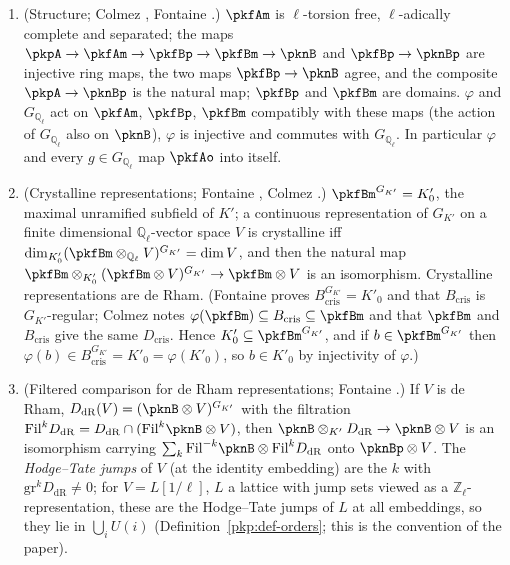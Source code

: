 \documentclass[10pt]{amsart}
\theoremstyle{definition}
\theoremstyle{remark}
\newcommand{\Z}{\mathbb Z}
\newcommand{\Q}{\mathbb Q}
\begin{document}
\begin{enumerate}
\item[(P1)] (Structure; Colmez \cite[\S III.2]{pkfColmez98}, Fontaine \cite[4.1]{pkfFontaineII}.)
$\pkfAm$ is $\ell$-torsion free, $\ell$-adically complete and separated; the maps
$\pkpA\to\pkfAm\to\pkfBp\to\pkfBm\to\pknB$ and $\pkfBp\to\pknBp$ are injective ring maps, the two maps
$\pkfBp\to\pknB$ agree, and the composite $\pkpA\to\pknBp$ is the natural map; $\pkfBp$ and $\pkfBm$
are domains. $\varphi$ and $G_{\Q_\ell}$ act on $\pkfAm$, $\pkfBp$, $\pkfBm$ compatibly with these maps
(the action of $G_{\Q_\ell}$ also on $\pknB$), $\varphi$ is injective and commutes with $G_{\Q_\ell}$.
In particular $\varphi$ and every $g\in G_{\Q_\ell}$ map $\pkfAo$ into itself.
\item[(P2)] (Crystalline representations; Fontaine \cite[5.1.2]{pkfFontaineIII}, Colmez \cite[\S\S III.2, III.4]{pkfColmez98}.) $\pkfBm^{G_{K'}}=K'_0$, the maximal unramified subfield of $K'$; a continuous
representation of $G_{K'}$ on a finite dimensional $\Q_\ell$-vector space $V$ is crystalline iff
$\dim_{K'_0}(\pkfBm\otimes_{\Q_\ell}V)^{G_{K'}}=\dim V$, and then the natural map
$\pkfBm\otimes_{K'_0}(\pkfBm\otimes V)^{G_{K'}}\to\pkfBm\otimes V$ is an isomorphism. Crystalline
representations are de Rham. (Fontaine proves $B_{\mathrm{cris}}^{G_{K'}}=K'_0$ and that $B_{\mathrm{cris}}$ is $G_{K'}$-regular; Colmez notes $\varphi(\pkfBm)\subseteq B_{\mathrm{cris}}\subseteq\pkfBm$ and that $\pkfBm$ and $B_{\mathrm{cris}}$ give the same $D_{\mathrm{cris}}$. Hence $K'_0\subseteq\pkfBm^{G_{K'}}$, and if $b\in\pkfBm^{G_{K'}}$ then $\varphi(b)\in B_{\mathrm{cris}}^{G_{K'}}=K'_0=\varphi(K'_0)$, so $b\in K'_0$ by injectivity of $\varphi$.)
\item[(P3)] (Filtered comparison for de Rham representations; Fontaine \cite[3.8]{pkfFontaineIII}.) If $V$ is de Rham, $D_{\mathrm{dR}}(V)=(\pknB\otimes V)^{G_{K'}}$ with the filtration
$\mathrm{Fil}^kD_{\mathrm{dR}}=D_{\mathrm{dR}}\cap(\mathrm{Fil}^k\pknB\otimes V)$, then
$\pknB\otimes_{K'}D_{\mathrm{dR}}\to\pknB\otimes V$ is an isomorphism carrying
$\sum_{k}\mathrm{Fil}^{-k}\pknB\otimes\mathrm{Fil}^kD_{\mathrm{dR}}$ onto $\pknBp\otimes V$. The
\emph{Hodge--Tate jumps} of $V$ (at the identity embedding) are the $k$ with
$\mathrm{gr}^kD_{\mathrm{dR}}\ne0$; for $V=L[1/\ell]$, $L$ a lattice with jump sets viewed as a
$\Z_\ell$-representation, these are the Hodge--Tate jumps of $L$ at all embeddings, so they lie in
$\bigcup_iU(i)$ (Definition~\ref{pkp:def-orders}; this is the convention of the paper).

\end{enumerate}
\end{document}
